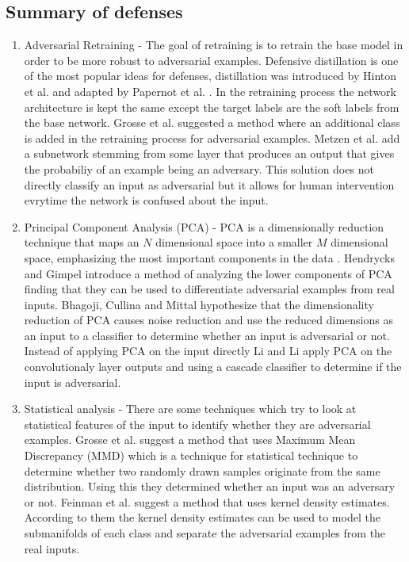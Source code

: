 \documentclass[journal,onecolumn]{IEEEtran}
\begin{document}
\subsection{Summary of defenses}

\begin{enumerate}
\item Adversarial Retraining - The goal of retraining is to retrain the base model in order to be more robust to adversarial examples. Defensive distillation is one of the most popular ideas for defenses, distillation was introduced by Hinton et al. \cite{hinton_distilling_2015} and adapted by Papernot et al. \cite{papernot_distillation_2015}. In the retraining process the network architecture is kept the same except the target labels are the soft labels from the base network. Grosse et al.\cite{grosse_statistical_2017} suggested a method where an additional class is added in the retraining process for adversarial examples. Metzen et al. \cite{metzen_detecting_2017} add a subnetwork stemming from some layer that produces an output that gives the probabiliy of an example being an adversary. This solution does not directly classify an input as adversarial but it allows for human intervention evrytime the network is confused about the input.

\item Principal Component Analysis (PCA) - PCA is a dimensionally reduction technique that maps an $N$ dimensional space into a smaller $M$ dimensional space, emphasizing the most important components in the data \cite{shlens_tutorial_2014}. Hendrycks and Gimpel \cite{hendrycks_early_2016} introduce a method of analyzing the lower components of PCA finding that they can be used to differentiate adversarial examples from real inputs. Bhagoji, Cullina and Mittal \cite{bhagoji_enhancing_2017} hypothesize that the dimensionality reduction of PCA causes noise reduction and use the reduced dimensions as an input to a classifier to determine whether an input is adversarial or not. Instead of applying PCA on the input directly Li and Li \cite{li_adversarial_2017} apply PCA on the convolutionaly layer outputs and using a cascade classifier \cite{viola_robust_nodate} to determine if the input is adversarial.

\item Statistical analysis - There are some techniques which try to look at statistical features of the input to identify whether they are adversarial examples. Grosse et al. \cite{grosse_statistical_2017} suggest a method that uses Maximum Mean Discrepancy (MMD) \cite{gretton_kernel_2012} which is a technique for statistical technique to determine whether two randomly drawn samples originate from the same distribution. Using this they determined whether an input was an adversary or not. Feinman et al. \cite{feinman_detecting_2017} suggest a method that uses kernel density estimates. According to them the kernel density estimates can be used to model the submanifolds of each class and separate the adversarial examples from the real inputs.
\end{enumerate}
\end{document}
